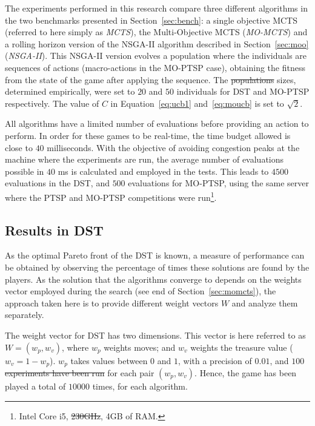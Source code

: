 \documentclass[journal]{IEEEtran}
\providecommand{\DIFaddtex}[1]{{\protect\color{blue}\uwave{#1}}} %
\providecommand{\DIFdeltex}[1]{{\protect\color{red}\sout{#1}}}                      %
\providecommand{\DIFaddbegin}{} %
\providecommand{\DIFaddend}{} %
\providecommand{\DIFdelbegin}{} %
\providecommand{\DIFdelend}{} %
\providecommand{\DIFadd}[1]{\texorpdfstring{\DIFaddtex{#1}}{#1}} %
\providecommand{\DIFdel}[1]{\texorpdfstring{\DIFdeltex{#1}}{}} %
\begin{document}
The experiments performed in this research compare three different algorithms in the two benchmarks presented in Section~\ref{sec:bench}: a single objective MCTS (referred to here simply as \textit{MCTS}), the Multi-Objective MCTS (\textit{MO-MCTS}) and a rolling horizon version of the NSGA-II algorithm described in Section~\ref{sec:moo} (\textit{NSGA-II}). This NSGA-II version evolves a population where the individuals are sequences of actions (macro-actions in the MO-PTSP case), obtaining the fitness from the state of the game after applying the sequence. The \DIFdelbegin \DIFdel{populations }\DIFdelend \DIFaddbegin \DIFadd{population }\DIFaddend sizes, determined empirically, were set to $20$ and $50$ individuals for DST and MO-PTSP respectively. The value of $C$ in Equation~\ref{eq:ucb1} and~\ref{eq:moucb} is set to $\sqrt{2}$.

All \DIFaddbegin \DIFadd{the }\DIFaddend algorithms have a limited number of evaluations before providing an action to perform. In order for these games to be real-time, the time budget allowed is close to $40$ milliseconds. With the objective of avoiding congestion peaks at the machine where the experiments are run, the average number of evaluations possible in $40$ ms is calculated and employed in the tests. This leads to $4500$ evaluations in the DST, and $500$ evaluations for MO-PTSP, using the same server where the PTSP and MO-PTSP competitions were run\footnote{Intel Core i5, \DIFdelbegin \DIFdel{230GHz}\DIFdelend \DIFaddbegin \DIFadd{2.90GHz}\DIFaddend , 4GB of RAM.}.


\subsection{Results in DST} \label{ssec:resDST}


As the optimal Pareto front of the DST is known, a measure of performance can be obtained by observing the percentage of times these solutions are found by the players. As the solution that the algorithms converge to depends on the weights vector employed during the search (see end of Section~\ref{sec:momcts}), the approach taken here is to provide different weight vectors $W$ and analyze them separately.  

The weight vector for DST has two dimensions. This vector is here referred to as $W = (w_p, w_v)$, where $w_p$ weights moves; and $w_v$ weights the treasure value ($w_v = 1 - w_p$). $w_p$ takes values between $0$ and $1$, with a precision of $0.01$, and $100$ \DIFdelbegin \DIFdel{experiments have been run }\DIFdelend \DIFaddbegin \DIFadd{runs have been performed }\DIFaddend for each pair $(w_p, w_v)$. Hence, the game has been played a total of $10000$ times, for each algorithm.
\end{document}
